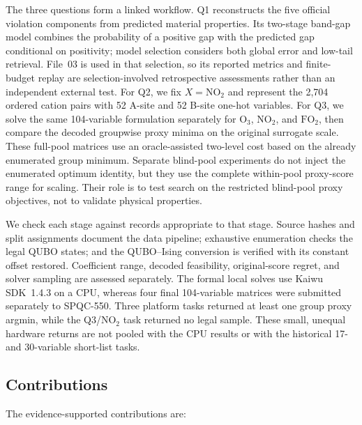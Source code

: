 The three questions form a linked workflow.  Q1 reconstructs the five
official violation components from predicted material properties.  Its
two-stage band-gap model combines the probability of a positive gap with
the predicted gap conditional on positivity; model selection considers
both global error and low-tail retrieval.  File~03 is used in that
selection, so its reported metrics and finite-budget replay are
selection-involved retrospective assessments rather than an independent
external test.  For Q2, we fix $X=\mathrm{NO}_2$ and represent the 2,704
ordered cation pairs with 52 A-site and 52 B-site one-hot variables.  For
Q3, we solve the same 104-variable formulation separately for
$\mathrm{O}_3$, $\mathrm{NO}_2$, and $\mathrm{FO}_2$, then compare the
decoded groupwise proxy minima on the original surrogate scale.  These
full-pool matrices use an oracle-assisted two-level cost based on the
already enumerated group minimum.  Separate blind-pool experiments do not
inject the enumerated optimum identity, but they use the complete
within-pool proxy-score range for scaling.  Their role is to test search on
the restricted blind-pool proxy objectives, not to validate physical
properties.

We check each stage against records appropriate to that stage.  Source
hashes and split assignments document the data pipeline; exhaustive
enumeration checks the legal QUBO states; and the QUBO--Ising conversion is
verified with its constant offset restored.  Coefficient range, decoded
feasibility, original-score regret, and solver sampling are assessed
separately.  The formal local solves use Kaiwu SDK~1.4.3 on a CPU, whereas
four final 104-variable matrices were submitted separately to SPQC-550.
Three platform tasks returned at least one group proxy argmin, while the
Q3/$\mathrm{NO}_2$ task returned no legal sample.  These small, unequal hardware
returns are not pooled with the CPU results or with the historical
17- and 30-variable short-list tasks.

\subsection{Contributions}

The evidence-supported contributions are:

